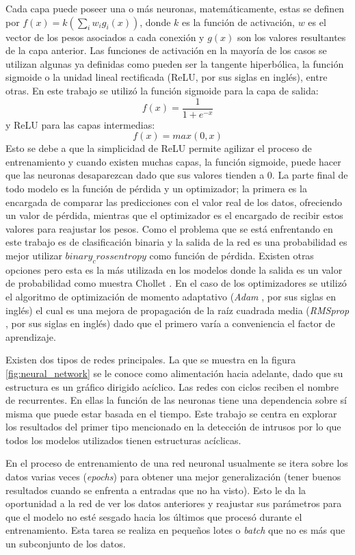 Cada capa puede poseer una o más neuronas, matemáticamente, estas se definen por $f(x) = k(\sum_{i}w_{i}g_{i}(x))$, donde $k$ es la función de activación, $w$ es el vector de los pesos asociados a cada conexión y $g(x)$ son los valores resultantes de la capa anterior. Las funciones de activación en la mayoría de los casos se utilizan algunas ya definidas como pueden ser la tangente hiperbólica, la función sigmoide o la unidad lineal rectificada (ReLU, por sus siglas en inglés), entre otras. En este trabajo se utilizó la función sigmoide para la capa de salida: \[f(x) = \frac{1}{1 + e^{-x}}\] y ReLU para las capas intermedias: \[f(x)=max(0,x)\]
Esto se debe a que la simplicidad de ReLU permite agilizar el proceso de entrenamiento y cuando existen muchas capas, la función sigmoide, puede hacer que las neuronas desaparezcan dado que sus valores tienden a 0. La parte final de todo modelo es la función de pérdida y un optimizador; la primera es la encargada de comparar las predicciones con el valor real de los datos, ofreciendo un valor de pérdida, mientras que el optimizador es el encargado de recibir estos valores para reajustar los pesos. Como el problema que se está enfrentando en este trabajo es de clasificación binaria y la salida de la red es una probabilidad es mejor utilizar $binary_crossentropy$ como función de pérdida. Existen otras opciones pero esta es la más utilizada en los modelos donde la salida es un valor de probabilidad como muestra Chollet \cite{10.5555/3203489}. En el caso de los optimizadores se utilizó el algoritmo de optimizaci\'on de momento adaptativo (\textit{Adam} \cite{kingma2014adam}, por sus siglas en inglés) el cual es una mejora de propagación de la raíz cuadrada media (\textit{RMSprop} \cite{tieleman2012lecture}, por sus siglas en inglés) dado que el primero varía a conveniencia el factor de aprendizaje.

Existen dos tipos de redes principales. La que se muestra en la figura \ref{fig:neural_network} se le conoce como alimentación hacia adelante, dado que su estructura es un gráfico dirigido acíclico. Las redes con ciclos reciben el nombre de recurrentes. En ellas la función de las neuronas tiene una dependencia sobre s\'i misma que puede estar basada en el tiempo. Este trabajo se centra en explorar los resultados del primer tipo mencionado en la detección de intrusos por lo que todos los modelos utilizados tienen estructuras ac\'iclicas.

En el proceso de entrenamiento de una red neuronal usualmente se itera sobre los datos varias veces (\textit{epochs}) para obtener una mejor generalización (tener buenos resultados cuando se enfrenta a entradas que no ha visto). Esto le da la oportunidad a la red de ver los datos anteriores y reajustar sus parámetros para que el modelo no esté sesgado hacia los últimos que procesó durante el entrenamiento. Esta tarea se realiza en pequeños lotes o \textit{batch} que no es más que un subconjunto de los datos.

